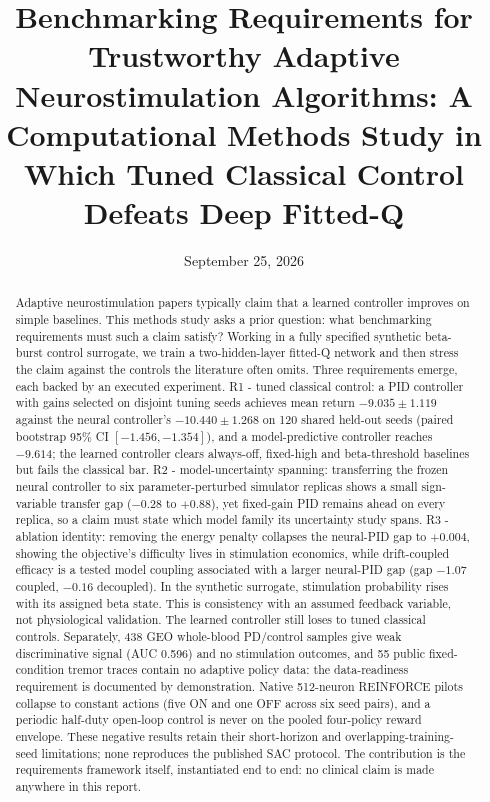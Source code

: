 
\title{Benchmarking Requirements for Trustworthy Adaptive Neurostimulation Algorithms: A Computational Methods Study in Which Tuned Classical Control Defeats Deep Fitted-Q}
\date{September 25, 2026}
\maketitle
\begin{abstract}
Adaptive neurostimulation papers typically claim that a learned controller improves on simple baselines. This methods study asks a prior question: what benchmarking requirements must such a claim satisfy? Working in a fully specified synthetic beta-burst control surrogate, we train a two-hidden-layer fitted-Q network and then stress the claim against the controls the literature often omits. Three requirements emerge, each backed by an executed experiment. R1 - tuned classical control: a PID controller with gains selected on disjoint tuning seeds achieves mean return $-9.035 \pm 1.119$ against the neural controller's $-10.440 \pm 1.268$ on 120 shared held-out seeds (paired bootstrap 95\% CI $[-1.456, -1.354]$), and a model-predictive controller reaches $-9.614$; the learned controller clears always-off, fixed-high and beta-threshold baselines but fails the classical bar. R2 - model-uncertainty spanning: transferring the frozen neural controller to six parameter-perturbed simulator replicas shows a small sign-variable transfer gap ($-0.28$ to $+0.88$), yet fixed-gain PID remains ahead on every replica, so a claim must state which model family its uncertainty study spans. R3 - ablation identity: removing the energy penalty collapses the neural-PID gap to $+0.004$, showing the objective's difficulty lives in stimulation economics, while drift-coupled efficacy is a tested model coupling associated with a larger neural-PID gap (gap $-1.07$ coupled, $-0.16$ decoupled). In the synthetic surrogate, stimulation probability rises with its assigned beta state. This is consistency with an assumed feedback variable, not physiological validation. The learned controller still loses to tuned classical controls. Separately, 438 GEO whole-blood PD/control samples give weak discriminative signal (AUC 0.596) and no stimulation outcomes, and 55 public fixed-condition tremor traces contain no adaptive policy data: the data-readiness requirement is documented by demonstration. Native 512-neuron REINFORCE pilots collapse to constant actions (five ON and one OFF across six seed pairs), and a periodic half-duty open-loop control is never on the pooled four-policy reward envelope. These negative results retain their short-horizon and overlapping-training-seed limitations; none reproduces the published SAC protocol. The contribution is the requirements framework itself, instantiated end to end: no clinical claim is made anywhere in this report.
\end{abstract}
